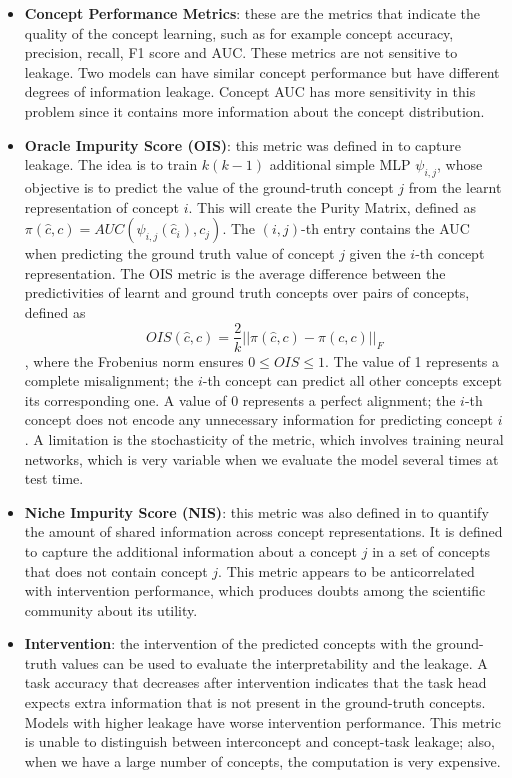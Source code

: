\begin{itemize}
    \item \textbf{Concept Performance Metrics}: these are the metrics that indicate the quality of the concept learning, such as for example 
    concept accuracy, precision, recall, F1 score and AUC. These metrics are not sensitive to leakage. Two models can have similar concept 
    performance but have different degrees of information leakage. Concept AUC has more sensitivity in this problem since it contains more 
    information about the concept distribution. 
    \item \textbf{Oracle Impurity Score (OIS)}: this metric was defined in \cite{Espinosa_Zarlenga_2023} to capture leakage. The idea is to 
    train $k(k-1)$ additional simple MLP $\psi_{i,j}$, whose objective is to predict the value of the ground-truth concept $j$ from the 
    learnt representation of concept $i$. This will create the Purity Matrix, defined as $\pi(\hat c, c) = AUC(\psi_{i,j}(\hat c_i), c_j)$. 
    The $(i,j)$-th entry contains the AUC when predicting the ground truth value of concept $j$ given the $i$-th concept representation. 
    The OIS metric is the average difference between the predictivities of learnt and ground truth concepts over pairs of concepts, defined 
    as $$OIS(\hat c, c) = \frac{2}{k} ||\pi(\hat c, c) - \pi(c,c)||_F$$, where the Frobenius norm ensures $0\leq OIS\leq 1$. The value of 
    1 represents a complete misalignment; the $i$-th concept can predict all other concepts except its corresponding one. A value of 0 
    represents a perfect alignment; the $i$-th concept does not encode any unnecessary information for predicting concept $i$. A limitation 
    is the stochasticity of the metric, which involves training neural networks, which is very variable when we evaluate the model several 
    times at test time. 
    \item \textbf{Niche Impurity Score (NIS)}: this metric was also defined in \cite{Espinosa_Zarlenga_2023} to quantify the amount of shared information across concept representations.  It is defined to capture the additional information about a concept $j$ in a set of concepts that does not contain concept $j$. This metric appears to be anticorrelated with intervention performance, which produces doubts among the scientific community about its utility. 
    \item \textbf{Intervention}: the intervention of the predicted concepts with the ground-truth values can be used to evaluate the 
    interpretability and the leakage. A task accuracy that decreases after intervention indicates that the task head expects extra information 
    that is not present in the ground-truth concepts. Models with higher leakage have worse intervention performance. This metric is unable 
    to distinguish between interconcept and concept-task leakage; also, when we have a large number of concepts, the computation is very expensive. 
\end{itemize}
